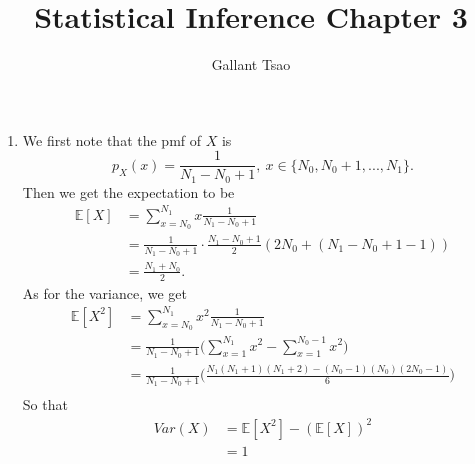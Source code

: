 \documentclass{article}
\title{Statistical Inference Chapter 3}
\author{Gallant Tsao}
\begin{document}
\maketitle

\begin{enumerate}
    \item We first note that the pmf of $X$ is 
    \[ p_X(x) = \frac{1}{N_1 - N_0 + 1}, \ x \in \{N_0, N_0 + 1, ..., N_1\}. \]
    Then we get the expectation to be 
    \begin{align*}
        \mathbb{E}[X]
        &= \sum_{x = N_0}^{N_1} x\frac{1}{N_1 - N_0 + 1} \\
        &= \frac{1}{N_1 - N_0 + 1} \cdot \frac{N_1 - N_0 + 1}{2} (2N_0 + (N_1 - N_0 + 1 - 1)) \\
        &= \frac{N_1 + N_0}{2}.
    \end{align*}
    As for the variance, we get 
    \begin{align*}
        \mathbb{E}[X^2]
        &= \sum_{x = N_0}^{N_1} x^2 \frac{1}{N_1 - N_0 + 1} \\ 
        &= \frac{1}{N_1 - N_0 + 1} \Big( \sum_{x = 1}^{N_1}x^2 - \sum_{x = 1}^{N_0 - 1} x^2 \Big) \\
        &= \frac{1}{N_1 - N_0 + 1} \Big( \frac{N_1(N_1 + 1)(N_1 + 2) - (N_0 - 1)(N_0)(2N_0 - 1)}{6} \Big) \\
    \end{align*}
    So that 
    \begin{align*}
        Var(X)
        &= \mathbb{E}[X^2] - (\mathbb{E}[X])^2 \\
        &= 1
    \end{align*}


\end{enumerate}
\end{document}
